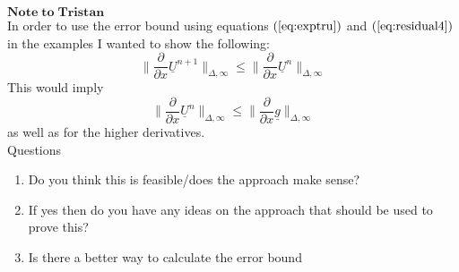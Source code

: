 \documentclass[11pt]{article}
\newcommand{\pl}{\partial}
\newcommand{\D}{\Delta}
\begin{document}
$\mathbf{Note\; to\; Tristan}$\\
In order to use the error bound using equations $(\ref{eq:exptru})$ and  $(\ref{eq:residual4})$ in the examples I wanted to show the following:
$$\|\frac{\pl }{\pl{x}}\underline{U}^{n+1}\|_{\D,\infty} \leq \|\frac{\pl }{\pl{x}}\underline{U}^n \|_{\D,\infty}$$
This would imply $$\|\frac{\pl }{\pl{x} }\underline{U}^{n}\|_{\D,\infty} \leq \|\frac{\pl }{\pl{x} }\underline{g}\|_{\D,\infty}$$
as well as for the higher derivatives.\\
Questions\\
\begin{enumerate}
\item{Do you think this is feasible/does the approach make sense?}
\item{If yes then do you have any ideas on the approach that should be used to prove this?}
\item{Is there a better way to calculate the error bound}
\end{enumerate}

%
%
%
\end{document}
